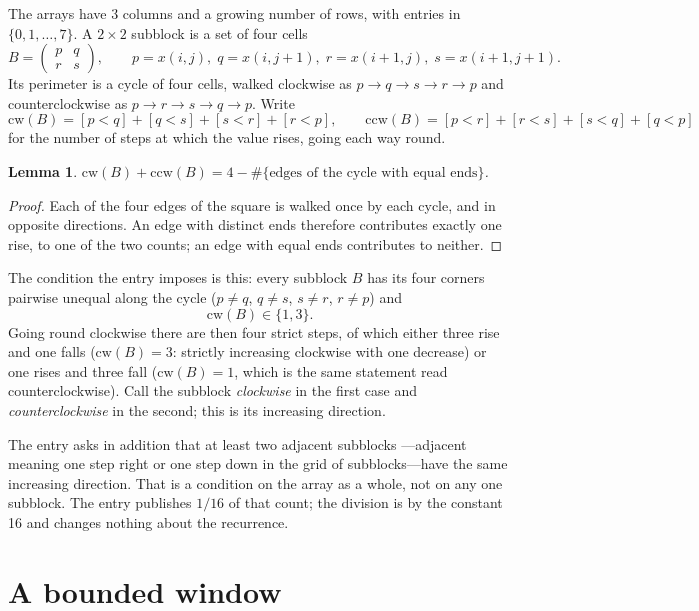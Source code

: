 \documentclass[11pt,a4paper]{article}
\theoremstyle{plain}
\newtheorem{lemma}[theorem]{Lemma}
\theoremstyle{definition}
\begin{document}
The arrays have $3$ columns and a growing number of rows, with entries in $\{0,1,\dots,7\}$. A
$2\times2$ subblock is a set of four cells
\[
B=\begin{pmatrix} p & q \\ r & s \end{pmatrix},
\qquad p=x(i,j),\; q=x(i,j+1),\; r=x(i+1,j),\; s=x(i+1,j+1).
\]
Its perimeter is a cycle of four cells, walked clockwise as $p\to q\to s\to r\to p$ and
counterclockwise as $p\to r\to s\to q\to p$. Write
\[
\mathrm{cw}(B)=[p<q]+[q<s]+[s<r]+[r<p],\qquad
\mathrm{ccw}(B)=[p<r]+[r<s]+[s<q]+[q<p]
\]
for the number of steps at which the value rises, going each way round.

\begin{lemma}\label{lem:sum}
$\mathrm{cw}(B)+\mathrm{ccw}(B)=4-\#\{\text{edges of the cycle with equal ends}\}$.
\end{lemma}

\begin{proof}
Each of the four edges of the square is walked once by each cycle, and in opposite directions.
An edge with distinct ends therefore contributes exactly one rise, to one of the two counts;
an edge with equal ends contributes to neither.
\end{proof}

The condition the entry imposes is this: every subblock $B$ has its four corners pairwise unequal along the cycle ($p\ne q$, $q\ne s$, $s\ne r$, $r\ne p$) and
\[
\mathrm{cw}(B)\in\{1,3\}.
\]
Going round clockwise there are then four strict steps, of which either three rise and one falls ($\mathrm{cw}(B)=3$: strictly increasing clockwise with one decrease) or one rises and three fall ($\mathrm{cw}(B)=1$, which is the same statement read counterclockwise). Call the subblock \emph{clockwise} in the first case and \emph{counterclockwise} in the second; this is its increasing direction.

The entry asks in addition that at least two adjacent subblocks ---adjacent meaning one step right or one step down in the grid of subblocks---have the same increasing direction. That is a condition on the array as a whole, not on any one subblock. The entry publishes $1/16$ of that count; the division is by the constant 16 and changes nothing about the recurrence.

\section{A bounded window}
\end{document}
